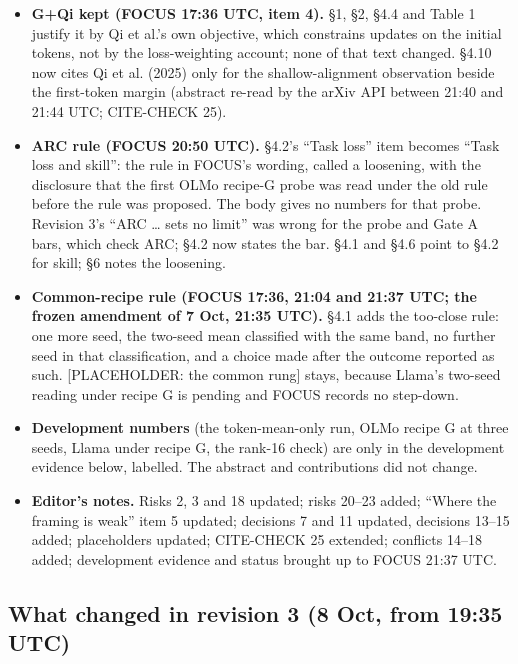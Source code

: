 \documentclass{article}
\theoremstyle{plain}
\theoremstyle{definition}
\theoremstyle{remark}
\begin{document}
\begin{itemize}
  \item \textbf{G+Qi kept (FOCUS 17:36 UTC, item 4).} \S{}1, \S{}2, \S{}4.4 and
        Table 1 justify it by Qi et al.'s own objective, which constrains
        updates on the initial tokens, not by the loss-weighting account; none
        of that text changed. \S{}4.10 now cites Qi et al. (2025) only for the
        shallow-alignment observation beside the first-token margin (abstract
        re-read by the arXiv API between 21:40 and 21:44 UTC; CITE-CHECK 25).
  \item \textbf{ARC rule (FOCUS 20:50 UTC).} \S{}4.2's ``Task loss'' item
        becomes ``Task loss and skill'': the rule in FOCUS's wording, called a
        loosening, with the disclosure that the first OLMo recipe-G probe was
        read under the old rule before the rule was proposed. The body gives no
        numbers for that probe. Revision 3's ``ARC \ldots{} sets no limit'' was
        wrong for the probe and Gate A bars, which check ARC; \S{}4.2 now states
        the bar. \S{}4.1 and \S{}4.6 point to \S{}4.2 for skill; \S{}6 notes the
        loosening.
  \item \textbf{Common-recipe rule (FOCUS 17:36, 21:04 and 21:37 UTC; the frozen
        amendment of 7 Oct, 21:35 UTC).} \S{}4.1 adds the too-close rule: one
        more seed, the two-seed mean classified with the same band, no further
        seed in that classification, and a choice made after the outcome
        reported as such. [PLACEHOLDER: the common rung] stays, because Llama's
        two-seed reading under recipe G is pending and FOCUS records no
        step-down.
  \item \textbf{Development numbers} (the token-mean-only run, OLMo recipe G at
        three seeds, Llama under recipe G, the rank-16 check) are only in the
        development evidence below, labelled. The abstract and contributions did
        not change.
  \item \textbf{Editor's notes.} Risks 2, 3 and 18 updated; risks 20--23 added;
        ``Where the framing is weak'' item 5 updated; decisions 7 and 11
        updated, decisions 13--15 added; placeholders updated; CITE-CHECK 25
        extended; conflicts 14--18 added; development evidence and status
        brought up to FOCUS 21:37 UTC.
\end{itemize}

\subsection{What changed in revision 3 (8 Oct, from 19:35 UTC)}
\end{document}
